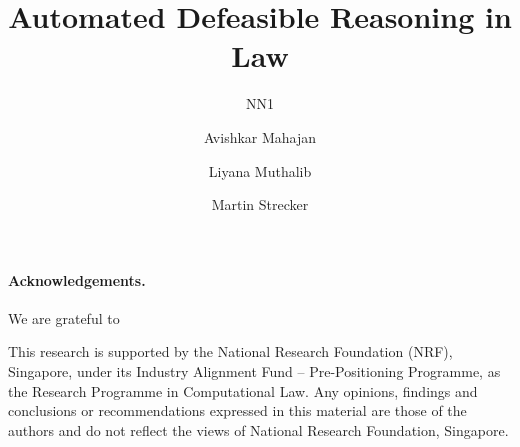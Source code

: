 \documentclass[runningheads]{llncs}
\begin{document}
\title{Automated Defeasible Reasoning in Law}

\author{NN1 \and
  Avishkar Mahajan \and
  Liyana Muthalib \and
  Martin Strecker}
\maketitle

\begin{abstract}

\end{abstract}













\paragraph{Acknowledgements.}
We are grateful to  

This research is supported by the National Research Foundation (NRF),
Singapore, under its Industry Alignment Fund – Pre-Positioning Programme, as
the Research Programme in Computational Law. Any opinions, findings and
conclusions or recommendations expressed in this material are those of the
authors and do not reflect the views of National Research Foundation,
Singapore.







% 
\end{document}
